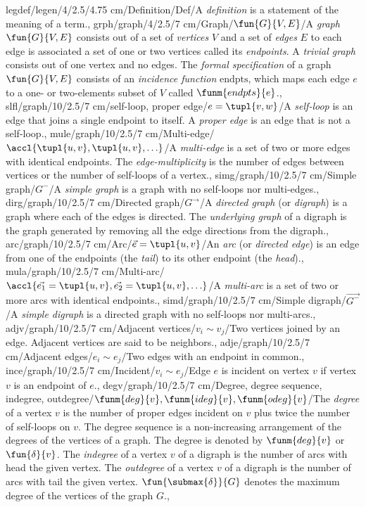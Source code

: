 legdef/legen/4/2.5/4.75 cm/Definition/Def/{A \emph{definition} is a statement of the meaning of a term.},%
grph/graph/4/2.5/7 cm/Graph/{$\fun{G}{V,E}$}/{A \emph{graph} $\fun{G}{V,E}$ consists out of a set of \emph{vertices} $V$ and a set of \emph{edges} $E$ to each edge is associated a set of one or two vertices called its \emph{endpoints}. A \emph{trivial graph} consists out of one vertex and no edges. The \emph{formal specification} of a graph $\fun{G}{V,E}$ consists of an \emph{incidence function} $\mbox{endpts}$, which maps each edge $e$ to a one- or two-elements subset of $V$ called $\funm{endpts}{e}$.},
slfl/graph/10/2.5/7 cm/{self-loop, proper edge}/$e=\tupl{v,w}$/{A \emph{self-loop} is an edge that joins a single endpoint to itself. A \emph{proper edge} is an edge that is not a self-loop.},
mule/graph/10/2.5/7 cm/{Multi-edge}/$\accl{\tupl{u,v},\tupl{u,v},\ldots}$/{A \emph{multi-edge} is a set of two or more edges with identical endpoints. The \emph{edge-multiplicity} is the number of edges between vertices or the number of self-loops of a vertex.},
simg/graph/10/2.5/7 cm/{Simple graph}/$G^{-}$/{A \emph{simple graph} is a graph with no self-loops nor multi-edges.},
dirg/graph/10/2.5/7 cm/{Directed graph}/$G^{\rightarrow}$/{A \emph{directed graph} (or \emph{digraph}) is a graph where each of the edges is directed. The \emph{underlying graph} of a digraph is the graph generated by removing all the edge directions from the digraph.},
arc/graph/10/2.5/7 cm/{Arc}/$\vec{e}=\tupl{u,v}$/{An \emph{arc} (or \emph{directed edge}) is an edge from one of the endpoints (the \emph{tail}) to its other endpoint (the \emph{head}).},
mula/graph/10/2.5/7 cm/{Multi-arc}/$\accl{\vec{e_1}=\tupl{u,v},\vec{e_2}=\tupl{u,v},\ldots}$/{A \emph{multi-arc} is a set of two or more arcs with identical endpoints.},
simd/graph/10/2.5/7 cm/{Simple digraph}/$\vec{G^-}$/{A \emph{simple digraph} is a directed graph with no self-loops nor multi-arcs.},
adjv/graph/10/2.5/7 cm/{Adjacent vertices}/{$v_i\sim v_j$}/{Two vertices joined by an edge. Adjacent vertices are said to be neighbors.},
adje/graph/10/2.5/7 cm/{Adjacent edges}/{$e_i\sim e_j$}/{Two edges with an endpoint in common.},
ince/graph/10/2.5/7 cm/{Incident}/{$v_i\sim e_j$}/{Edge $e$ is incident on vertex $v$ if vertex $v$ is an endpoint of $e$.},
degv/graph/10/2.5/7 cm/{Degree, degree sequence, indegree, outdegree}/{$\funm{deg}{v},\funm{ideg}{v},\funm{odeg}{v}$}/{The \emph{degree} of a vertex $v$ is the number of proper edges incident on $v$ plus twice the number of self-loops on $v$. The degree sequence is a non-increasing arrangement of the degrees of the vertices of a graph. The degree is denoted by $\funm{deg}{v}$ or $\fun{\delta}{v}$. The \emph{indegree} of a vertex $v$ of a digraph is the number of arcs with head the given vertex. The \emph{outdegree} of a vertex $v$ of a digraph is the number of arcs with tail the given vertex. $\fun{\submax{\delta}}{G}$ denotes the maximum degree of the vertices of the graph $G$.},
